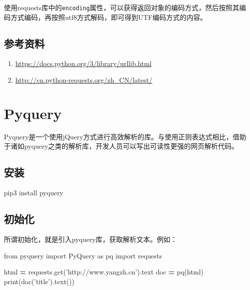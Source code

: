 \documentclass[]{ctexbook}
\newenvironment{Shaded}{\begin{snugshade}}{\end{snugshade}}
\newcommand{\BuiltInTok}[1]{#1}
\newcommand{\ExtensionTok}[1]{#1}
\newcommand{\ImportTok}[1]{#1}
\newcommand{\NormalTok}[1]{#1}
\newcommand{\OperatorTok}[1]{\textcolor[rgb]{0.81,0.36,0.00}{\textbf{#1}}}
\newcommand{\StringTok}[1]{\textcolor[rgb]{0.31,0.60,0.02}{#1}}
\providecommand{\tightlist}{%
  \setlength{\itemsep}{0pt}\setlength{\parskip}{0pt}}
\begin{document}
使用requests库中的\texttt{encoding}属性，可以获得返回对象的编码方式，然后按照其编码方式编码，再按照utf8方式解码，即可得到UTF编码方式的内容。

\hypertarget{ux53c2ux8003ux8d44ux6599-2}{%
\section{参考资料}\label{ux53c2ux8003ux8d44ux6599-2}}

\begin{enumerate}
\def\labelenumi{\arabic{enumi}.}
\tightlist
\item
  \url{https://docs.python.org/3/library/urllib.html}
\item
  \url{http://cn.python-requests.org/zh_CN/latest/}
\end{enumerate}

\hypertarget{pyquery}{%
\chapter{Pyquery}\label{pyquery}}

Pyquery是一个使用jQuery方式进行高效解析的库。与使用正则表达式相比，借助于诸如pyquery之类的解析库，开发人员可以写出可读性更强的网页解析代码。

\hypertarget{ux5b89ux88c5}{%
\section{安装}\label{ux5b89ux88c5}}

\begin{Shaded}
\begin{Highlighting}[]
\ExtensionTok{pip3}\NormalTok{ install pyquery}
\end{Highlighting}
\end{Shaded}

\hypertarget{ux521dux59cbux5316}{%
\section{初始化}\label{ux521dux59cbux5316}}

所谓初始化，就是引入pyquery库，获取解析文本。例如：

\begin{Shaded}
\begin{Highlighting}[]
\ImportTok{from}\NormalTok{ pyquery }\ImportTok{import}\NormalTok{ PyQuery }\ImportTok{as}\NormalTok{ pq}
\ImportTok{import}\NormalTok{ requests}

\NormalTok{html }\OperatorTok{=}\NormalTok{ requests.get(}\StringTok{'http://www.yangzh.cn'}\NormalTok{).text}
\NormalTok{doc }\OperatorTok{=}\NormalTok{ pq(html)}
\BuiltInTok{print}\NormalTok{(doc(}\StringTok{'title'}\NormalTok{).text())}
\end{Highlighting}
\end{Shaded}
\end{document}
